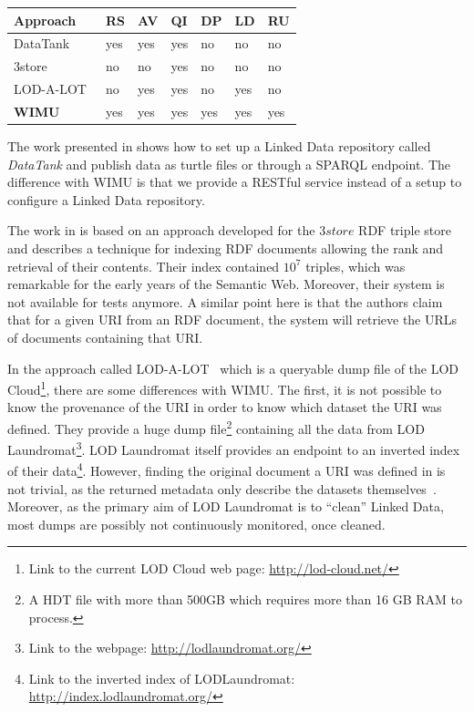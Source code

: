 \begin{table}[H]
\caption{State of the art overview of Resources (R), Methodologies (M) and Benchmark (B) regarding to RESTful service (RS), Avaibility (AV), Queryble Index (QI), Dataset Provenance (DP), Largest Linked Data hubs (LD) and Ranked Score URI-Dataset (RU)}
\label{tab:soaIdenty}
\begin{center}
\begin{longtable}{@{}lllllll@{}}
\toprule
\textbf{Approach} & \textbf{RS} & \textbf{AV} & \textbf{QI} & \textbf{DP} & \textbf{LD} & \textbf{RU}\\ \midrule
DataTank\cite{colpaert2014painless} & yes & yes & yes & no & no & no\\
3store\cite{harris2004semindex} & no & no & yes & no & no & no\\
LOD-A-LOT~\cite{fernandez2017lod} & no & yes & yes & no & yes & no\\
\textbf{WIMU}~\cite{valdestilhas2018my} & yes & yes & yes & yes & yes & yes\\
\bottomrule
\end{longtable}
\end{center}
\end{table}

The work presented in \cite{colpaert2014painless} shows how to set up a Linked Data repository called \emph{DataTank} and publish data as turtle files or through a SPARQL endpoint.
The difference with WIMU is that we provide a RESTful service instead of a setup to configure a Linked Data repository.

The work in \cite{harris2004semindex} is based on an approach developed for the $3store$ RDF triple store and describes a technique for indexing RDF documents allowing the rank and retrieval of their contents. 
Their index contained $10^7$ triples, which was remarkable for the early years of the Semantic Web.
Moreover, their system is not available for tests anymore.
A similar point here is that the authors claim that for a given URI from an RDF document, the system will retrieve the URLs of documents containing that URI.

In the approach called LOD-A-LOT~\cite{fernandez2017lod} which is a queryable dump file of the LOD Cloud\footnote{Link to the current LOD Cloud web page: \url{http://lod-cloud.net/}}, there are some differences with WIMU.
The first, it is not possible to know the provenance of the URI in order to know which dataset the URI was defined. 
They provide a huge dump file\footnote{A HDT file with more than 500GB which requires more than 16 GB RAM to process.} containing all the data from LOD Laundromat\footnote{Link to the webpage: \url{http://lodlaundromat.org/}}.
LOD Laundromat itself provides an endpoint to an inverted index of their data\footnote{Link to the inverted index of LODLaundromat: \url{http://index.lodlaundromat.org/}}.
However, finding the original document a URI was defined in is not trivial, as the returned metadata only describe the datasets themselves~\cite{beek2014lod}.
Moreover, as the primary aim of LOD Laundromat is to ``clean'' Linked Data, most dumps are possibly not continuously monitored, once cleaned.

